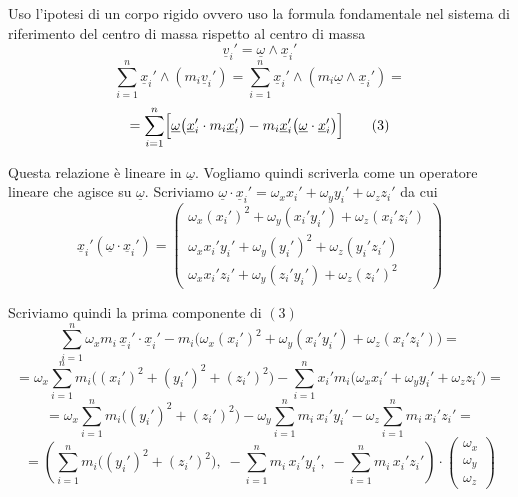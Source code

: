 Uso l'ipotesi di un corpo rigido ovvero uso la formula fondamentale nel sistema di riferimento del centro di massa rispetto al centro di massa
\[
\underline{v}_i'=\underline{\omega}\wedge \underline{x}_i'
\]
\[
\sum_{i=1}^{n}\underline{x}_i'\wedge (m_i\underline{v}_i')
=
\sum_{i=1}^{n}\underline{x}_i'\wedge (m_i\underline{\omega}\wedge \underline{x}_i')
=
\]
\[
=
\sum_{i=1}^{n}\Bigl[\underline{\omega}\bigl(\underline{x}_i'\cdot m_i\underline{x}_i'\bigr)-m_i\underline{x}_i'\bigl(\underline{\omega}\cdot \underline{x}_i'\bigr)\Bigr]
\qquad (3)
\]

Questa relazione è lineare in \(\underline{\omega}\).
Vogliamo quindi scriverla come un operatore lineare che agisce su \(\underline{\omega}\).
Scriviamo \(\underline{\omega}\cdot \underline{x}_i'=\omega_x x_i'+\omega_y y_i'+\omega_z z_i'\) da cui
\[
\underline{x}_i'(\underline{\omega}\cdot \underline{x}_i')
=
\begin{pmatrix}
\omega_x (x_i')^2+\omega_y (x_i'y_i')+\omega_z (x_i'z_i')\\
\omega_x x_i'y_i'+\omega_y (y_i')^2+\omega_z (y_i'z_i')\\
\omega_x x_i'z_i'+\omega_y (z_i'y_i')+\omega_z (z_i')^2
\end{pmatrix}
\]

Scriviamo quindi la prima componente di \((3)\)
\[
\sum_{i=1}^{n} \omega_x m_i\,\underline{x}_i'\cdot \underline{x}_i'
-
m_i\bigl(\omega_x(x_i')^2+\omega_y(x_i'y_i')+\omega_z(x_i'z_i')\bigr)
=
\]
\[
=
\omega_x\sum_{i=1}^{n} m_i\bigl((x_i')^2+(y_i')^2+(z_i')^2\bigr)
-
\sum_{i=1}^{n} x_i' m_i \bigl(\omega_x x_i'+\omega_y y_i'+\omega_z z_i'\bigr)
=
\]
\[
=
\omega_x\sum_{i=1}^{n} m_i\bigl((y_i')^2+(z_i')^2\bigr)
-
\omega_y\sum_{i=1}^{n} m_i\,x_i' y_i'
-
\omega_z\sum_{i=1}^{n} m_i\,x_i' z_i'
=
\]
\[
=
\left(
\sum_{i=1}^{n} m_i\bigl((y_i')^2+(z_i')^2\bigr),
\;
-\sum_{i=1}^{n} m_i\,x_i' y_i',
\;
-\sum_{i=1}^{n} m_i\,x_i' z_i'
\right)\cdot
\begin{pmatrix}
\omega_x\\
\omega_y\\
\omega_z
\end{pmatrix}
\]

